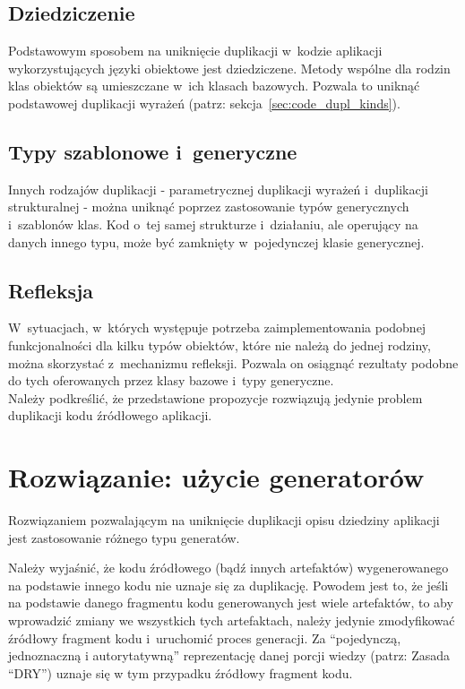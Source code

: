\subsection{Dziedziczenie}

Podstawowym sposobem na uniknięcie duplikacji w~kodzie aplikacji wykorzystujących języki obiektowe jest dziedziczene.
Metody wspólne dla rodzin klas obiektów są umieszczane w~ich klasach bazowych.
Pozwala to uniknąć podstawowej duplikacji wyrażeń (patrz: sekcja~\ref{sec:code_dupl_kinds}).


\subsection{Typy szablonowe i~generyczne}

Innych rodzajów duplikacji - parametrycznej duplikacji wyrażeń i~duplikacji strukturalnej - można uniknąć poprzez zastosowanie typów generycznych i~szablonów klas.
Kod o~tej samej strukturze i~działaniu, ale operujący na danych innego typu, może być zamknięty w~pojedynczej klasie generycznej.


\subsection{Refleksja}

W~sytuacjach, w~których występuje potrzeba zaimplementowania podobnej funkcjonalności dla kilku typów obiektów, które nie należą do jednej rodziny, można skorzystać z~mechanizmu refleksji.
Pozwala on osiągnąć rezultaty podobne do tych oferowanych przez klasy bazowe i~typy generyczne.\\


Należy podkreślić, że przedstawione propozycje rozwiązują jedynie problem duplikacji kodu źródłowego aplikacji.


\section{Rozwiązanie: użycie generatorów}

Rozwiązaniem pozwalającym na uniknięcie duplikacji opisu dziedziny aplikacji jest zastosowanie różnego typu generatów.

Należy wyjaśnić, że kodu źródłowego (bądź innych artefaktów) wygenerowanego na podstawie innego kodu nie uznaje się za duplikację.
Powodem jest to, że jeśli na podstawie danego fragmentu kodu generowanych jest wiele artefaktów, to aby wprowadzić zmiany we wszystkich tych artefaktach, należy jedynie  zmodyfikować źródłowy fragment kodu i~uruchomić proces generacji.
Za ``pojedynczą, jednoznaczną i autorytatywną'' reprezentację danej porcji wiedzy (patrz: Zasada ``DRY'') uznaje się w tym przypadku źródłowy fragment kodu.


